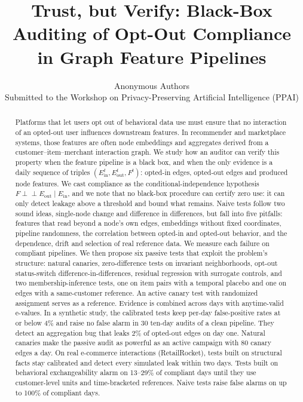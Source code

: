 \documentclass[10pt,twocolumn,letterpaper]{article}
\title{\Large\bfseries Trust, but Verify: Black-Box Auditing of Opt-Out Compliance\\ in Graph Feature Pipelines}
\author{Anonymous Authors\\ \normalsize Submitted to the Workshop on Privacy-Preserving Artificial Intelligence (PPAI)}
\date{}
\theoremstyle{definition}
\newcommand{\Ein}{E_{\mathrm{in}}}
\newcommand{\Eout}{E_{\mathrm{out}}}
\newcommand{\indep}{\perp\!\!\!\perp}
\begin{document}
\maketitle

\begin{abstract}
Platforms that let users opt out of behavioral data use must ensure that no
interaction of an opted-out user influences downstream features. In
recommender and marketplace systems, those features are often node embeddings
and aggregates derived from a customer--item--merchant interaction graph. We
study how an auditor can verify this property when the feature pipeline is a
black box, and when the only evidence is a daily sequence of triples
$(\Ein^t, \Eout^t, F^t)$: opted-in edges, opted-out edges and produced
node features. We cast compliance as the conditional-independence hypothesis
$F \indep \Eout \mid \Ein$, and we note that no black-box procedure can
certify zero use: it can only detect leakage above a threshold and bound what
remains. Naive tests follow two sound ideas, single-node change and
difference in differences, but fall into five pitfalls: features that read
beyond a node's own edges, embeddings without fixed coordinates, pipeline
randomness, the correlation between opted-in and opted-out behavior, and the
dependence, drift and selection of real reference data. We measure each
failure on compliant pipelines.
We then propose six passive tests that exploit the problem's structure:
natural canaries, zero-difference tests on invariant neighborhoods, opt-out
status-switch difference-in-differences, residual regression with surrogate
controls, and two membership-inference tests, one on item pairs with a
temporal placebo and one on edges with a same-customer reference. An active
canary test with randomized assignment serves as a reference. Evidence is combined across days with anytime-valid
e-values. In a synthetic study, the calibrated tests keep per-day false-positive
rates at or below 4\% and raise no false alarm in 30 ten-day audits of a clean
pipeline. They detect an aggregation bug that leaks 2\% of opted-out edges on
day one. Natural canaries make the passive audit as powerful as an active
campaign with 80 canary edges a day. On real e-commerce interactions
(RetailRocket), tests built on structural facts stay calibrated and detect
every simulated leak within two days. Tests built on behavioral exchangeability
alarm on 13--29\% of compliant days until they use customer-level units and
time-bracketed references. Naive tests raise false alarms on up to 100\% of
compliant days.
\end{abstract}
\end{document}

